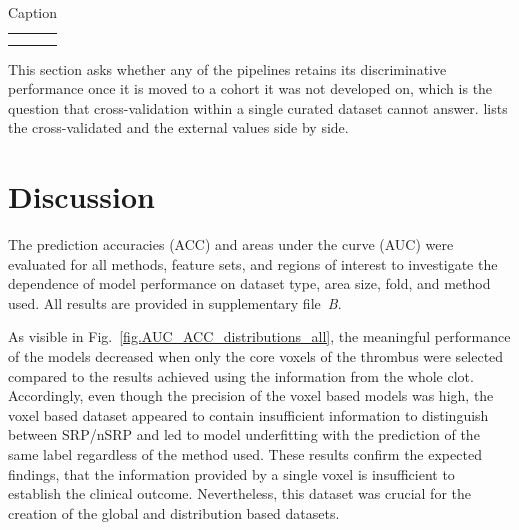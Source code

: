 \documentclass[preprint,12pt]{elsarticle}
\begin{document}
\label{sec:results:external}
\begin{table}[]
    \centering
    \begin{tabular}{c|c}
         &  \\
         & 
    \end{tabular}
    \caption{Caption}
    \label{tab:placeholder}
\end{table}



This section asks whether any of the pipelines retains its discriminative performance once it is moved to a cohort it was not developed on, which is the question that cross-validation within a single curated dataset cannot answer.  lists the cross-validated and the external values side by side.









\section{Discussion}

The prediction accuracies (ACC) and areas under the curve (AUC) were evaluated for all methods, feature sets, and regions of interest to investigate the dependence of model performance on dataset type, area size, fold, and method used. All results are provided in supplementary file~\textit{B}. 



As visible in Fig.~\ref{fig.AUC_ACC_distributions_all}, the meaningful performance of the models decreased when only the core voxels of the thrombus were selected compared to the results achieved using the information from the whole clot. Accordingly, even though the precision of the voxel based models was high, the voxel based dataset appeared to contain insufficient information to distinguish between SRP/nSRP and led to model underfitting with the prediction of the same label regardless of the method used. These results confirm the expected findings, that the information provided by a single voxel is insufficient to establish the clinical outcome. Nevertheless, this dataset was crucial for the creation of the global and distribution based datasets.
\end{document}
